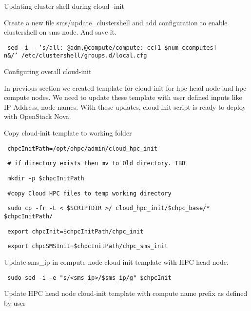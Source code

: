 \documentclass[12pt]{article}
\begin{document}
Updating cluster shell during cloud -init

Create a new file sms/update\_clustershell and add configuration to enable clustershell on sms node. And save it. 

\begin{bash}\texttt{\small{ sed -i -- 's/all: @adm,@compute/compute: cc[1-\${num\_ccomputes}]\\n\&/' /etc/clustershell/groups.d/local.cfg}}\end{bash}


Configuring overall cloud-init

In previous section we created template for cloud-init for hpc head node and hpc compute nodes. We need to update these template with user defined inputs like IP Address, node names. With these updates, cloud-init script is ready to deploy with OpenStack Nova.

Copy cloud-init template to working folder

\begin{bash}\texttt{\small{ chpcInitPath=/opt/ohpc/admin/cloud\_hpc\_init}}\end{bash}
\begin{bash}\texttt{\small{ \# if directory exists then mv to Old directory. TBD}}\end{bash}
\begin{bash}\texttt{\small{ mkdir -p \$chpcInitPath}}\end{bash}
\begin{bash}\texttt{\small{ \#copy Cloud HPC files to temp working directory}}\end{bash}
\begin{bash}\texttt{\small{ sudo cp -fr -L < \${SCRIPTDIR} >/ cloud\_hpc\_init/\${chpc\_base}/* \$chpcInitPath/}}\end{bash}
\begin{bash}\texttt{\small{ export chpcInit=\$chpcInitPath/chpc\_init}}\end{bash}
\begin{bash}\texttt{\small{ export chpcSMSInit=\$chpcInitPath/chpc\_sms\_init}}\end{bash}

Update sms\_ip in compute node cloud-init template with HPC head node. 

\begin{bash}\texttt{\small{ sudo sed -i -e "s/<sms\_ip>/\${sms\_ip}/g" \$chpcInit}}\end{bash}

Update HPC head node cloud-init template with compute name prefix as defined by user
\end{document}
